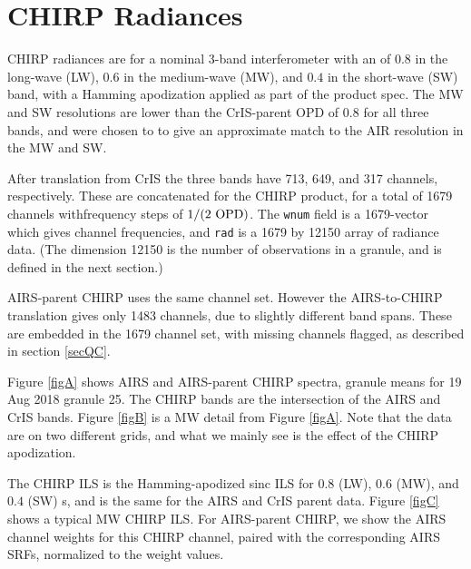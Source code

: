 \documentclass[12pt]{article}
\begin{document}
\section{CHIRP Radiances}

CHIRP radiances are for a nominal 3-band interferometer with an
{\opd} of $0.8$ {\cm} in the long-wave (LW), $0.6$ {\cm} in the
medium-wave (MW), and $0.4$ {\cm} in the short-wave (SW) band, with
a Hamming apodization applied as part of the product spec.  The MW
and SW resolutions are lower than the CrIS-parent OPD of $0.8$ {\cm}
for all three bands, and were chosen to to give an approximate match
to the AIR resolution in the MW and SW.

After translation from CrIS the three bands have 713, 649, and 317
channels, respectively.  These are concatenated for the CHIRP
product, for a total of 1679 channels withfrequency steps of $1/(2
\hbox{ OPD})$.  The \texttt{wnum} field is a 1679-vector which gives
channel frequencies, and \texttt{rad} is a 1679 by 12150 array of
radiance data.  (The dimension 12150 is the number of observations
in a granule, and is defined in the next section.)

AIRS-parent CHIRP uses the same channel set.  However the
AIRS-to-CHIRP translation gives only 1483 channels, due to slightly
different band spans.  These are embedded in the 1679 channel set,
with missing channels flagged, as described in section \ref{secQC}.

Figure \ref{figA} shows AIRS and AIRS-parent CHIRP spectra, granule
means for 19 Aug 2018 granule 25.  The CHIRP bands are the
intersection of the AIRS and CrIS bands.  Figure \ref{figB} is a MW
detail from Figure \ref{figA}.  Note that the data are on two
different grids, and what we mainly see is the effect of the CHIRP
apodization.

The CHIRP ILS is the Hamming-apodized sinc ILS for $0.8$ {\cm} (LW),
$0.6$ {\cm} (MW), and $0.4$ {\cm} (SW) {\opd}s, and is the same for
the AIRS and CrIS parent data.  Figure \ref{figC} shows a typical MW
CHIRP ILS.  For AIRS-parent CHIRP, we show the AIRS channel weights
for this CHIRP channel, paired with the corresponding AIRS SRFs,
normalized to the weight values.


% 
\end{document}
